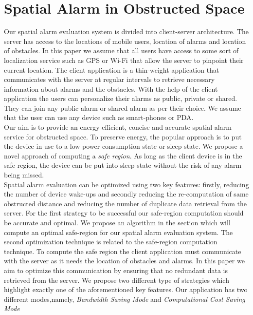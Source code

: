 \documentclass{sig-alternate}
\begin{document}
\section{Spatial Alarm in Obstructed Space}
Our spatial alarm evaluation system is divided into client-server architecture. The server has access to the locations of mobile users, location of alarms and location of obstacles. In this paper we assume that all users have access to some sort of localization service such as GPS or Wi-Fi that allow the server to pinpoint their current location. The client application is a thin-weight application that communicates with the server at regular intervals to retrieve necessary information about alarms and the obstacles. With the help of the client application the users can personalize their alarms as public, private or shared. They can join any public alarm or shared alarm as per their choice. We assume that the user can use any device such as smart-phones or PDA.\\ Our aim is to provide an energy-efficient, concise and accurate spatial alarm service for obstructed space. To preserve energy, the popular approach is to put the device in use to a low-power consumption state or sleep state. We propose a novel approach of computing a \textit{safe region}. As long as the client device is in the safe region, the device can be put into sleep state without the risk of any alarm being missed. \\

Spatial alarm evaluation can be optimized using two key features: firstly, reducing the number of device wake-ups and secondly reducing the re-computation of same obstructed distance and reducing the number of duplicate data retrieval from the server. For the first strategy to be successful our safe-region computation should be accurate and optimal. We propose an algorithm in the section which will compute an optimal safe-region for our spatial alarm evaluation system. The second optimization technique is related to the safe-region computation technique. To compute the safe region the client application must communicate with the server as it needs the location of obstacles and alarms. In this paper we aim to optimize this communication by ensuring that no redundant data is retrieved from the server. We propose two different type of strategies which highlight exactly one of the aforementioned key features. Our application has two different modes,namely, \textit{Bandwidth Saving Mode} and \textit{Computational Cost Saving Mode}
\end{document}
